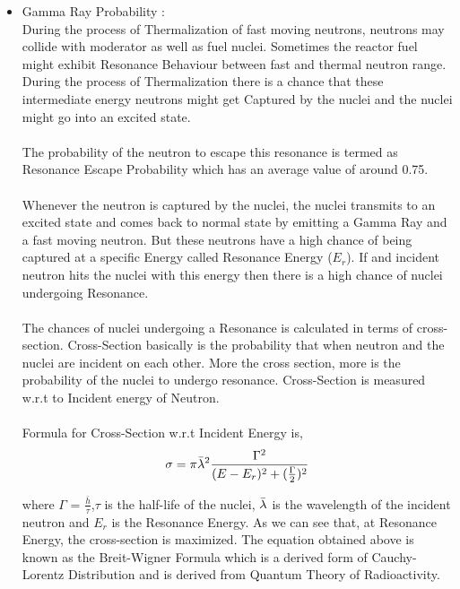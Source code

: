 \documentclass{article}
\begin{document}
\begin{itemize}
\begin{itemize}
        \item Gamma Ray Probability :\\
            During the process of Thermalization of fast moving neutrons, neutrons may collide with moderator as well as fuel nuclei. Sometimes the reactor fuel might exhibit Resonance Behaviour between fast and thermal neutron range. During the process of Thermalization there is a chance that these intermediate energy neutrons might get Captured by the nuclei and the nuclei might go into an excited state.\\
            \\
            The probability of the neutron to escape this resonance is termed as Resonance Escape Probability which has an average value of around 0.75.\cite{cite12}\\
            \\
            Whenever the neutron is captured by the nuclei, the nuclei transmits to an excited state and comes back to normal state by emitting a Gamma Ray and a fast moving neutron. But these neutrons have a high chance of being captured at a specific Energy called Resonance Energy ($E_r$). If and incident neutron hits the nuclei with this energy then there is a high chance of nuclei undergoing Resonance.\\
            \\
            The chances of nuclei undergoing a Resonance is calculated in terms of cross-section. Cross-Section basically is the probability that when neutron and the nuclei are incident on each other. More the cross section, more is the probability of the nuclei to undergo resonance. Cross-Section is measured w.r.t to Incident energy of Neutron.\\
            \\
            Formula for Cross-Section w.r.t Incident Energy is,
            $$\sigma = \pi \Bar{\lambda}^2 \frac{\Gamma^2}{(E - E_r)^2 + (\frac{\Gamma}{2})^2}$$
            
            where $\Gamma$ = $\frac{\bar{h}}{\tau}$,$\tau$ is the half-life of the nuclei, $\Bar{\lambda}$ is the wavelength of the incident neutron and $E_r$ is the Resonance Energy. As we can see that, at Resonance Energy, the cross-section is maximized. The equation obtained above is known as the Breit-Wigner Formula which is a derived form of Cauchy-Lorentz Distribution and is derived from Quantum Theory of Radioactivity.
    \end{itemize}
\end{itemize}
\end{document}
